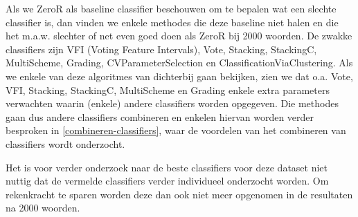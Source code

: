 Als we ZeroR als baseline classifier beschouwen om te bepalen wat een slechte classifier is, dan vinden we enkele methodes die deze baseline niet halen en die het m.a.w. slechter of net even goed doen als ZeroR bij 2000 woorden. De zwakke classifiers zijn VFI (Voting Feature Intervals), Vote, Stacking, StackingC, MultiScheme, Grading, CVParameterSelection en ClassificationViaClustering. Als we enkele van deze algoritmes van dichterbij gaan bekijken, zien we dat o.a. Vote, VFI, Stacking, StackingC, MultiScheme en Grading enkele extra parameters verwachten waarin (enkele) andere classifiers worden opgegeven. Die methodes gaan dus andere classifiers combineren en enkelen hiervan worden verder besproken in \ref{combineren-classifiers}, waar de voordelen van het combineren van classifiers wordt onderzocht. 

Het is voor verder onderzoek naar de beste classifiers voor deze dataset niet nuttig dat de vermelde classifiers verder individueel onderzocht worden. Om rekenkracht te sparen worden deze dan ook niet meer opgenomen in de resultaten na 2000 woorden.

